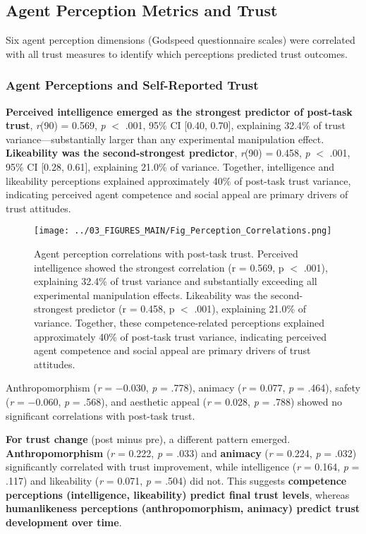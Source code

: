 \documentclass[12pt]{article}
\begin{document}
\subsection{Agent Perception Metrics and Trust}

Six agent perception dimensions (Godspeed questionnaire scales) were correlated with all trust measures to identify which perceptions predicted trust outcomes.

\subsubsection{Agent Perceptions and Self-Reported Trust}

\textbf{Perceived intelligence emerged as the strongest predictor of post-task trust}, \textit{r}(90) = 0.569, \textit{p} $<$ .001, 95\% CI [0.40, 0.70], explaining 32.4\% of trust variance---substantially larger than any experimental manipulation effect. \textbf{Likeability was the second-strongest predictor}, \textit{r}(90) = 0.458, \textit{p} $<$ .001, 95\% CI [0.28, 0.61], explaining 21.0\% of variance. Together, intelligence and likeability perceptions explained approximately 40\% of post-task trust variance, indicating perceived agent competence and social appeal are primary drivers of trust attitudes.

\begin{figure}[h]
\centering
\texttt{[image: ../03\_FIGURES\_MAIN/Fig\_Perception\_Correlations.png]}
\caption{Agent perception correlations with post-task trust. Perceived intelligence showed the strongest correlation (r = 0.569, p $<$ .001), explaining 32.4\% of trust variance and substantially exceeding all experimental manipulation effects. Likeability was the second-strongest predictor (r = 0.458, p $<$ .001), explaining 21.0\% of variance. Together, these competence-related perceptions explained approximately 40\% of post-task trust variance, indicating perceived agent competence and social appeal are primary drivers of trust attitudes.}
\label{fig:perception_correlations}
\end{figure}

Anthropomorphism (\textit{r} = $-$0.030, \textit{p} = .778), animacy (\textit{r} = 0.077, \textit{p} = .464), safety (\textit{r} = $-$0.060, \textit{p} = .568), and aesthetic appeal (\textit{r} = 0.028, \textit{p} = .788) showed no significant correlations with post-task trust.

\textbf{For trust change} (post minus pre), a different pattern emerged. \textbf{Anthropomorphism} (\textit{r} = 0.222, \textit{p} = .033) and \textbf{animacy} (\textit{r} = 0.224, \textit{p} = .032) significantly correlated with trust improvement, while intelligence (\textit{r} = 0.164, \textit{p} = .117) and likeability (\textit{r} = 0.071, \textit{p} = .504) did not. This suggests \textbf{competence perceptions (intelligence, likeability) predict final trust levels}, whereas \textbf{humanlikeness perceptions (anthropomorphism, animacy) predict trust development over time}.
\end{document}
